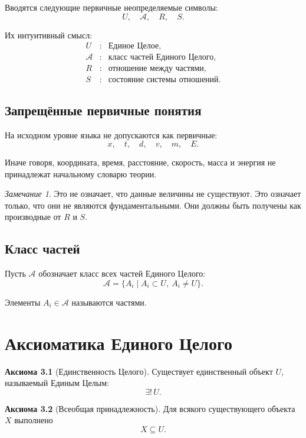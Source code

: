 \documentclass[12pt,a4paper,oneside]{book}
\theoremstyle{definition}
\newtheorem{axiom}{Аксиома}[chapter]
\theoremstyle{plain}
\theoremstyle{remark}
\newtheorem{remark}{Замечание}[chapter]
\newcommand{\Whole}{U}
\newcommand{\Parts}{\mathcal A}
\newcommand{\Rel}{R}
\newcommand{\State}{S}
\begin{document}
Вводятся следующие первичные неопределяемые символы:
\[
\Whole,\quad \Parts,\quad \Rel,\quad \State.
\]

Их интуитивный смысл:
\[
\begin{array}{rcl}
\Whole &:& \text{Единое Целое},\\
\Parts &:& \text{класс частей Единого Целого},\\
\Rel &:& \text{отношение между частями},\\
\State &:& \text{состояние системы отношений}.
\end{array}
\]

\section{Запрещённые первичные понятия}

На исходном уровне языка не допускаются как первичные:
\[
 x,\quad t,\quad d,\quad v,\quad m,\quad E.
\]

Иначе говоря, координата, время, расстояние, скорость, масса и энергия не принадлежат начальному словарю теории.

\begin{remark}
Это не означает, что данные величины не существуют. Это означает только, что они не являются фундаментальными. Они должны быть получены как производные от \(\Rel\) и \(\State\).
\end{remark}

\section{Класс частей}

Пусть \(\Parts\) обозначает класс всех частей Единого Целого:
\[
\Parts = \{A_i \mid A_i \subset \Whole,\ A_i \neq \Whole\}.
\]

Элементы \(A_i \in \Parts\) называются частями.

\chapter{Аксиоматика Единого Целого}

\begin{axiom}[Единственность Целого]
Существует единственный объект \(\Whole\), называемый Единым Целым:
\[
\exists!\,\Whole.
\]
\end{axiom}

\begin{axiom}[Всеобщая принадлежность]
Для всякого существующего объекта \(X\) выполнено
\[
X \subseteq \Whole.
\]
\end{axiom}
\end{document}
